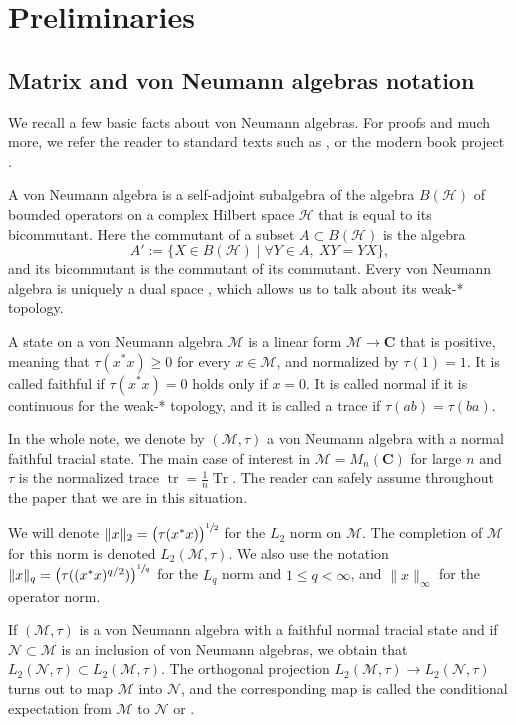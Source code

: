 \documentclass[JEP,XML,SOM,Unicode,published]{cedram}
\theoremstyle{plain}
\theoremstyle{definition}
\newcommand{\C}{\mathbf{C}}
\newcommand{\cM}{\mathcal{M}}
\newcommand{\cN}{\mathcal{N}}
\newcommand{\cH}{\mathcal{H}}
\DeclareMathOperator{\tr}{tr}
\DeclareMathOperator{\Tr}{Tr}
\begin{document}
\section{Preliminaries}\label{sec:preliminaries}
\subsection{Matrix and von Neumann algebras notation}
We recall a few basic facts about von Neumann algebras. For proofs and much more, we refer the reader to standard texts such as \cite{MR1873025}, or the modern book project \cite{AnantharamanPopa}.

A von Neumann algebra is a self-adjoint subalgebra of the algebra $B(\cH)$ of bounded operators on a complex Hilbert space $\cH$ that is equal to its bicommutant. Here the commutant of a subset $A\subset B(\cH)$ is the algebra
\[
A':=\{X\in B(\cH)\mid \forall Y \in A,\ XY=YX\},
\] and its bicommutant is the commutant of its commutant. Every von Neumann algebra is uniquely a dual space \cite[Cor.\,III.3.9]{MR1873025}, which allows us to talk about its weak-* topology.

A state on a von Neumann algebra $\cM$ is a linear form $\cM \to \C$ that is positive, meaning that $\tau(x^*x)\geq 0$ for every $x\in \cM$, and normalized by $\tau(1)=1$. It is called faithful if $\tau(x^*x)=0$ holds only if $x=0$. It is called normal if it is continuous for the weak-* topology, and it is called a trace if $\tau(ab)=\tau(ba)$.

In the whole note, we denote by $(\cM,\tau)$ a von Neumann algebra with a normal faithful tracial state. The main case of interest in $\cM = M_n(\C)$ for large $n$ and $\tau$ is the normalized trace $\tr = \frac{1}{n}\Tr$. The reader can safely assume throughout the paper that we are in this situation.

We will denote $\|x\|_2 = \big(\tau(x^*x)\big)^{\sfrac 1 2}$ for the $L_2$ norm on $\cM$. The completion of $\cM$ for this norm is denoted $L_2(\cM,\tau)$. We also use the notation $\|x\|_q = \big(\tau( (x^*x)^{q/2})\big)^{\sfrac 1 q}$ for the $L_q$ norm and $1\leq q<\infty$, and $\|x\|_\infty$ for the operator norm.

If $(\cM,\tau)$ is a von Neumann algebra with a faithful normal tracial state and if $\cN \subset\cM$ is an inclusion of von Neumann algebras, we obtain that $L_2(\cN,\tau)\subset L_2(\cM,\tau)$. The orthogonal projection $L_2(\cM,\tau) \to L_2(\cN,\tau)$ turns out to map $\cM$ into $\cN$, and the corresponding map is called the conditional expectation from $\cM$ to $\cN$ \cite[\S 9]{AnantharamanPopa} or \cite[Prop.\,V.2.36]{MR1873025}.
\end{document}
